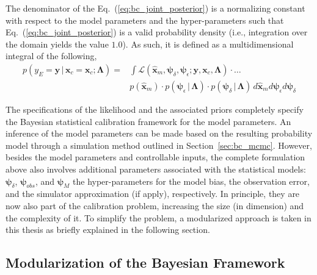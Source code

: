 The denominator of the Eq.~(\ref{eq:bc_joint_posterior}) is a normalizing constant with respect to the model parameters and the hyper-parameters such that Eq.~(\ref{eq:bc_joint_posterior}) is a valid probability density (i.e., integration over the domain yields the value $1.0$).
As such, it is defined as a multidimensional integral of the following,
\begin{equation}
	\begin{split}
	p(y_E = \mathbf{y} \,|\, \bm{x}_c = \mathbf{x}_c ; \bm{\Lambda}) = & \int \mathcal{L}(\hat{\bm{x}}_m,\bm{\psi}_\delta, \bm{\psi}_\epsilon ;  \mathbf{y}, \mathbf{x}_c, \bm{\Lambda}) \cdot \ldots \\
	& p(\hat{\bm{x}}_m) \cdot p(\bm{\psi}_\epsilon\,|\,\bm{\Lambda}) \cdot p(\bm{\psi}_\delta\,|\,\bm{\Lambda}) \, d\hat{\bm{x}}_m d\bm{\psi}_\epsilon d\bm{\psi}_\delta
	\end{split}
\label{eq:bc_normalizing_constant}
\end{equation}

The specifications of the likelihood and the associated priors completely specify the Bayesian statistical calibration framework for the model parameters.
An inference of the model parameters can be made based on the resulting probability model through a simulation method outlined in Section~\ref{sec:bc_mcmc}.
However, besides the model parameters and controllable inputs, the complete formulation above also involves additional parameters associated with the statistical models: $\bm{\psi}_\delta$, $\bm{\psi}_{obs}$, and $\bm{\psi}_M$ the hyper-parameters for the model bias, the observation error, and the simulator approximation (if apply), respectively.
In principle, they are now also part of the calibration problem, increasing the size (in dimension) and the complexity of it.
To simplify the problem, a modularized approach is taken in this thesis as briefly explained in the following section.

\subsection{Modularization of the Bayesian Framework}\label{sub:bc_modularization}


